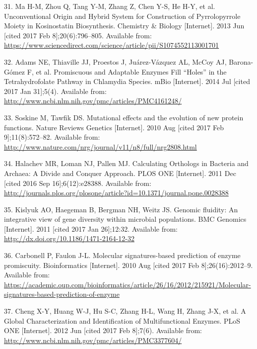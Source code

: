 \documentclass[12pt,twoside]{reedthesis}
\begin{document}
  \hypertarget{ref-ma_unconventional_2013}{}
  31. Ma H-M, Zhou Q, Tang Y-M, Zhang Z, Chen Y-S, He H-Y, et al.
  Unconventional Origin and Hybrid System for Construction of
  Pyrrolopyrrole Moiety in Kosinostatin Biosynthesis. Chemistry \& Biology
  {[}Internet{]}. 2013 Jun {[}cited 2017 Feb 8{]};20(6):796--805.
  Available from:
  \url{https://www.sciencedirect.com/science/article/pii/S1074552113001701}
  
  \hypertarget{ref-adams_promiscuous_2014}{}
  32. Adams NE, Thiaville JJ, Proestos J, Juárez-Vázquez AL, McCoy AJ,
  Barona-Gómez F, et al. Promiscuous and Adaptable Enzymes Fill ``Holes''
  in the Tetrahydrofolate Pathway in Chlamydia Species. mBio
  {[}Internet{]}. 2014 Jul {[}cited 2017 Jan 31{]};5(4). Available from:
  \url{http://www.ncbi.nlm.nih.gov/pmc/articles/PMC4161248/}
  
  \hypertarget{ref-soskine_mutational_2010}{}
  33. Soskine M, Tawfik DS. Mutational effects and the evolution of new
  protein functions. Nature Reviews Genetics {[}Internet{]}. 2010 Aug
  {[}cited 2017 Feb 9{]};11(8):572--82. Available from:
  \url{http://www.nature.com/nrg/journal/v11/n8/full/nrg2808.html}
  
  \hypertarget{ref-halachev_calculating_2011}{}
  34. Halachev MR, Loman NJ, Pallen MJ. Calculating Orthologs in Bacteria
  and Archaea: A Divide and Conquer Approach. PLOS ONE {[}Internet{]}.
  2011 Dec {[}cited 2016 Sep 16{]};6(12):e28388. Available from:
  \url{http://journals.plos.org/plosone/article?id=10.1371/journal.pone.0028388}
  
  \hypertarget{ref-kislyuk_genomic_2011}{}
  35. Kislyuk AO, Haegeman B, Bergman NH, Weitz JS. Genomic fluidity: An
  integrative view of gene diversity within microbial populations. BMC
  Genomics {[}Internet{]}. 2011 {[}cited 2017 Jan 26{]};12:32. Available
  from: \url{http://dx.doi.org/10.1186/1471-2164-12-32}
  
  \hypertarget{ref-carbonell_molecular_2010}{}
  36. Carbonell P, Faulon J-L. Molecular signatures-based prediction of
  enzyme promiscuity. Bioinformatics {[}Internet{]}. 2010 Aug {[}cited
  2017 Feb 8{]};26(16):2012--9. Available from:
  \url{https://academic.oup.com/bioinformatics/article/26/16/2012/215921/Molecular-signatures-based-prediction-of-enzyme}
  
  \hypertarget{ref-cheng_global_2012}{}
  37. Cheng X-Y, Huang W-J, Hu S-C, Zhang H-L, Wang H, Zhang J-X, et al. A
  Global Characterization and Identification of Multifunctional Enzymes.
  PLoS ONE {[}Internet{]}. 2012 Jun {[}cited 2017 Feb 8{]};7(6). Available
  from: \url{http://www.ncbi.nlm.nih.gov/pmc/articles/PMC3377604/}
  
\end{document}
